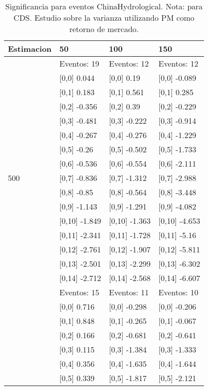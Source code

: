 \begin{table}

\caption{Significancia para eventos ChinaHydrological. Nota: para CDS. Estudio sobre la varianza utilizando PM como retorno de mercado.}
\centering
\begin{tabular}[t]{llll}
\toprule
Estimacion & 50 & 100 & 150\\
\midrule
 & Eventos:  19 & Eventos:  12 & Eventos:  12\\
 & {}[0,0] 0.044 & {}[0,0] 0.19 & {}[0,0] -0.089\\
 & {}[0,1] 0.183 & {}[0,1] 0.561 & {}[0,1] 0.285\\
 & {}[0,2] -0.356 & {}[0,2] 0.39 & {}[0,2] -0.229\\
 & {}[0,3] -0.481 & {}[0,3] -0.222 & {}[0,3] -0.914\\
\addlinespace
 & {}[0,4] -0.267 & {}[0,4] -0.276 & {}[0,4] -1.229\\
 & {}[0,5] -0.26 & {}[0,5] -0.502 & {}[0,5] -1.733\\
 & {}[0,6] -0.536 & {}[0,6] -0.554 & {}[0,6] -2.111\\
500 & {}[0,7] -0.836 & {}[0,7] -1.312 & {}[0,7] -2.988\\
 & {}[0,8] -0.85 & {}[0,8] -0.564 & {}[0,8] -3.448\\
\addlinespace
 & {}[0,9] -1.143 & {}[0,9] -1.291 & {}[0,9] -4.082\\
 & {}[0,10] -1.849 & {}[0,10] -1.363 & {}[0,10] -4.653\\
 & {}[0,11] -2.341 & {}[0,11] -1.728 & {}[0,11] -5.16\\
 & {}[0,12] -2.761 & {}[0,12] -1.907 & {}[0,12] -5.811\\
 & {}[0,13] -2.501 & {}[0,13] -2.299 & {}[0,13] -6.302\\
\addlinespace
 & {}[0,14] -2.712 & {}[0,14] -2.568 & {}[0,14] -6.607\\
 & Eventos:  15 & Eventos:  11 & Eventos:  10\\
 & {}[0,0] 0.716 & {}[0,0] -0.298 & {}[0,0] -0.206\\
 & {}[0,1] 0.848 & {}[0,1] -0.265 & {}[0,1] -0.067\\
 & {}[0,2] 0.166 & {}[0,2] -0.681 & {}[0,2] -0.641\\
\addlinespace
 & {}[0,3] 0.115 & {}[0,3] -1.384 & {}[0,3] -1.333\\
 & {}[0,4] 0.356 & {}[0,4] -1.635 & {}[0,4] -1.644\\
 & {}[0,5] 0.339 & {}[0,5] -1.817 & {}[0,5] -2.121\\

\end{tabular}
\end{table}

